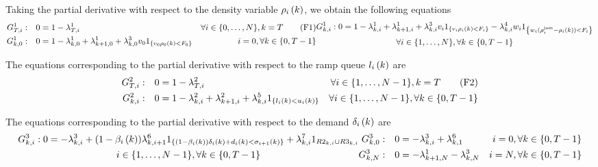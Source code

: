 Taking the partial derivative with respect to the density variable $\rho_{i}\left(k\right)$, we obtain the following equations
\begin{subequations}
\begin{align}
\G{1}{\ntime}{\icell}: && 0 &= 1 - \Lambd{1}{\ntime}{\icell}
& \forall \icell \in \{ 0, \dots, \ncell \}, \itime = \ntime
\tag{F1}
\label{eq:}
\\
\G{1}{\itime}{0}: && 0 &= 1 - \Lambd{1}{\itime}{0} + \Lambd{1}{\itime+1}{0} + \Lambd{3}{\itime}{0} \ffspeed{0} \ind{\ffspeed{0} \density{0}{\itime} < \fmax{0} }
& \icell = 0, \forall \itime \in \{0, \ntime - 1\}
\label{eq:}
\end{align}
\begin{multline}
\stdG{1}: 0 = 1 - \Lambd{1}{\itime}{\icell} + \Lambd{1}{\itime+1}{\icell} + \stdLambd{3} \ffspeed{\icell} \ind{\ffspeed{\icell}\density{\icell}{\itime}<\fmax{\icell}} - \stdLambd{4} \congspeed{\icell} \ind{\congspeed{\icell}(\jamdensity{\icell} - \density{\icell}{\itime}) < \fmax{\icell}}
\\
\forall \icell \in \{ 1, \dots, \ncell \}, \forall \itime \in \{0, \ntime - 1\}
\label{eq:}
\end{multline}
\end{subequations}

The equations corresponding to the partial derivative with respect to the ramp queue $l_{i}\left(k\right)$ are
\begin{align}
G^{2}_{T, i}: && 0 &= 1 - \lambda^{2}_{T, i}
& \forall i \in \{ 1, \dots, N-1 \}, k = T
\tag{F2}
\label{eq:}
\\
G^{2}_{k, i}: && 0 &= 1 - \lambda^{2}_{k, i} + \lambda^{2}_{k+1, i} + \lambda^{5}_{k, i} 1_{\left\{l_{i}\left(k\right) < u_{i}\left(k\right)\right\}}
& \forall i \in \{1, \dots, N - 1\}, \forall k \in \{0, T - 1\}
\label{eq:}
\end{align}

The equations corresponding to the partial derivative with respect to the demand $\delta_{i}\left(k\right)$ are
\begin{subequations}
\begin{multline}
\stdG{3}: 0 = - \Lambd{3}{\itime}{\icell} + (1-\offrampratio{\icell}{\itime})\Lambd{6}{\itime}{\icell+1} 
\ind{ (1-\offrampratio{\icell}{\itime})\celldemand{\icell}{\itime} + \rampdemand{\icell}{\itime} < \cellsupply{\icell+1}{\itime} } + 
\Lambd{7}{\itime}{\icell} 1_{\R{2}{\itime}{\icell} \cup \R{3}{\itime}{\icell}}
\\
\icell \in \{1, \dots, \ncell - 1\}, \forall \itime \in \{0, \ntime - 1\}
\label{eq:}
\end{multline}
%
\begin{align}
\G{3}{\itime}{0}: && 0 &= - \Lambd{3}{\itime}{\icell} + \Lambd{6}{\itime}{1}
& \icell = 0, \forall \itime \in \{0, \ntime - 1\}
\label{eq:}
\\
\G{3}{\itime}{\ncell}: && 0 &= - \Lambd{1}{\itime+1}{\ncell} - \Lambd{3}{\itime}{\ncell}
& \icell = \ncell, \forall \itime \in \{0, \ntime - 1\}
\label{eq:}
\end{align}
\end{subequations}

